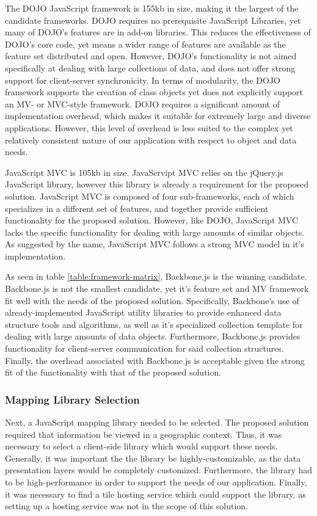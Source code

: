 \documentclass{report}
\begin{document}
The DOJO JavaScript framework is 155kb in size, making it the largest of the candidate frameworks. DOJO requires no prerequisite JavaScript Libraries, yet many of DOJO's features are in add-on libraries. This reduces the effectiveness of DOJO's core code, yet means a wider range of features are available as the feature set distributed and open. However, DOJO's functionality is not aimed specifically at dealing with large collections of data, and does not offer strong support for client-server synchronicity. In terms of modularity, the DOJO framework supports the creation of class objects yet does not explicitly support an MV- or MVC-style framework. DOJO requires a significant amount of implementation overhead, which makes it suitable for extremely large and diverse applications. However, this level of overhead is less suited to the complex yet relatively consistent nature of our application with respect to object and data needs.

JavaScript MVC is 105kb in size. JavaScrvipt MVC relies on the jQuery.js JavaScript library, however this library is already a requirement for the proposed solution. JavaScript MVC is composed of four sub-frameworks, each of which specializes in a different set of features, and together provide sufficient functionality for the proposed solution. However, like DOJO, JavaScript MVC lacks the specific functionality for dealing with large amounts of similar objects. As suggested by the name, JavaScript MVC follows a strong MVC model in it's implementation.

As seen in table \ref{table:framework-matrix}, Backbone.js is the winning candidate. Backbone.js is not the smallest candidate, yet it's feature set and MV framework fit well with the needs of the proposed solution. Specifically, Backbone's use of already-implemented JavaScript utility libraries to provide enhanced data structure tools and algorithms, as well as it's specialized collection template for dealing with large amounts of data objects. Furthermore, Backbone.js provides functionality for client-server communication for said collection structures. Finally, the overhead associated with Backbone.js is acceptable given the strong fit of the functionality with that of the proposed solution.

\subsubsection{Mapping Library Selection}

Next, a JavaScript mapping library needed to be selected. The proposed solution required that information be viewed in a geographic context. Thus, it was necessary to select a client-side library which would support these needs. Generally, it was important the the library be highly-customizable, as the data presentation layers would be completely customized. Furthermore, the library had to be high-performance in order to support the needs of our application. Finally, it was necessary to find a tile hosting service which could support the library, as setting up a hosting service was not in the scope of this solution.
\end{document}
